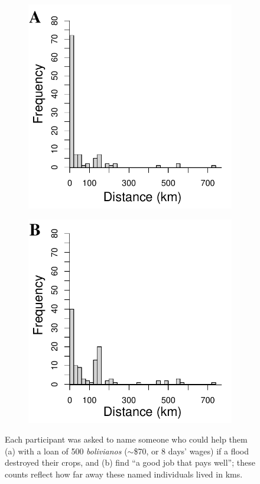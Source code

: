 \documentclass[bibauthoryear]{aa}
\begin{document}
\begin{figure}[t]
	\begin{subfigure}{0.5\columnwidth}
		\includegraphics[width=\linewidth]{FloodHistogram.pdf}
	\end{subfigure}%
	\begin{subfigure}{0.5\columnwidth}
		\includegraphics[width=\linewidth]{WorkHistogram.pdf}
	\end{subfigure}
	\caption{{\footnotesize Each participant was asked to name someone who could help them (a) with a loan of 500 \textit{bolivianos} ($\sim$\$70, or 8 days' wages) if a flood destroyed their crops, and (b) find ``a good job that pays well''; these counts reflect how far away these named individuals lived in kms.}} \label{boliviaflood}
\end{figure}
\end{document}
